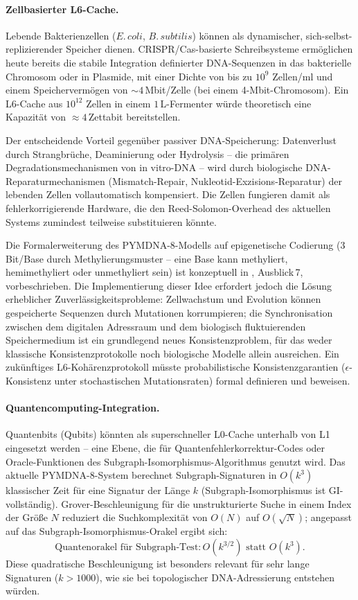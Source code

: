 ﻿\documentclass[a4paper,12pt]{article}
\theoremstyle{definition}
\begin{document}
\paragraph{Zellbasierter L6-Cache.}
Lebende Bakterienzellen ($E.\,coli$, $B.\,subtilis$) können als dynamischer, sich-selbst-replizierender Speicher dienen. CRISPR/Cas-basierte Schreibsysteme ermöglichen heute bereits die stabile Integration definierter DNA-Sequenzen in das bakterielle Chromosom oder in Plasmide, mit einer Dichte von bis zu $10^{9}$ Zellen/ml und einem Speichervermögen von $\sim 4$\,Mbit/Zelle (bei einem 4-Mbit-Chromosom). Ein L6-Cache aus $10^{12}$ Zellen in einem $1$\,L-Fermenter würde theoretisch eine Kapazität von $\approx 4$\,Zettabit bereitstellen.

Der entscheidende Vorteil gegenüber passiver DNA-Speicherung: Datenverlust durch Strangbrüche, Deaminierung oder Hydrolysis -- die primären Degradationsmechanismen von in vitro-DNA -- wird durch biologische DNA-Reparaturmechanismen (Mismatch-Repair, Nukleotid-Exzisions-Reparatur) der lebenden Zellen vollautomatisch kompensiert. Die Zellen fungieren damit als fehlerkorrigierende Hardware, die den Reed-Solomon-Overhead des aktuellen Systems zumindest teilweise substituieren könnte.

Die Formalerweiterung des PYMDNA-8-Modells auf epigenetische Codierung (3 Bit/Base durch Methylierungsmuster -- eine Base kann methyliert, hemimethyliert oder unmethyliert sein) ist konzeptuell in \cite{epp2026dnastor}, Ausblick\,7, vorbeschrieben. Die Implementierung dieser Idee erfordert jedoch die Lösung erheblicher Zuverlässigkeitsprobleme: Zellwachstum und Evolution können gespeicherte Sequenzen durch Mutationen korrumpieren; die Synchronisation zwischen dem digitalen Adressraum und dem biologisch fluktuierenden Speichermedium ist ein grundlegend neues Konsistenzproblem, für das weder klassische Konsistenzprotokolle noch biologische Modelle allein ausreichen. Ein zukünftiges L6-Kohärenzprotokoll müsste probabilistische Konsistenzgarantien ($\epsilon$-Konsistenz unter stochastischen Mutationsraten) formal definieren und beweisen.

\paragraph{Quantencomputing-Integration.}
Quantenbits (Qubits) könnten als superschneller L0-Cache unterhalb von L1 eingesetzt werden -- eine Ebene, die für Quantenfehlerkorrektur-Codes oder Oracle-Funktionen des Subgraph-Isomorphismus-Algorithmus genutzt wird. Das aktuelle PYMDNA-8-System berechnet Subgraph-Signaturen in $O(k^3)$ klassischer Zeit für eine Signatur der Länge $k$ (Subgraph-Isomorphismus ist GI-vollständig). Grover-Beschleunigung für die unstrukturierte Suche in einem Index der Größe $N$ reduziert die Suchkomplexität von $O(N)$ auf $O(\sqrt{N})$; angepasst auf das Subgraph-Isomorphismus-Orakel ergibt sich:
\[
  \text{Quantenorakel für Subgraph-Test}: O(k^{3/2}) \text{ statt } O(k^3).
\]
Diese quadratische Beschleunigung ist besonders relevant für sehr lange Signaturen ($k > 1000$), wie sie bei topologischer DNA-Adressierung entstehen würden.
\end{document}
